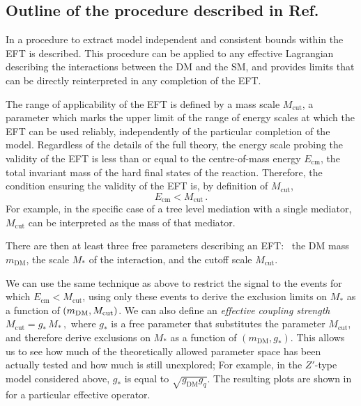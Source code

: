 \clearpage

\subsection*{Outline of the procedure described in Ref.~\cite{Racco:2015dxa}}

In \cite{Racco:2015dxa} a procedure to extract model independent and consistent bounds within the EFT is described. This procedure can be applied to any effective Lagrangian describing the interactions between the DM and the SM, and provides limits that can be directly reinterpreted in any completion of the EFT.

The range of applicability of the EFT is defined by a mass scale $M_\text{cut}$, a parameter which marks the upper limit of the range of energy scales at which the EFT can be used reliably, independently of the particular completion of the model. 
Regardless of the  details of the full theory, the energy scale probing the validity of the EFT is less than or equal to the centre-of-mass energy $E_\text{cm}$, 
the total invariant mass of the hard final states of the reaction.
Therefore, the condition ensuring the validity of the EFT is, by definition of $M_\text{cut}$,
\begin{equation}
\label{Ecm<Mcut}
E_\text{cm}<M_\text{cut}\,.
\end{equation}
For example, in the specific case of a tree level mediation with a single mediator, $M_\text{cut}$ can be interpreted as the mass of that mediator.

There are then at least three free parameters describing an EFT:~ 
the DM mass $m_\text{DM}$, the scale $M_*$ of the interaction, and the cutoff scale $M_\text{cut}$.

We can use the same technique as above to restrict the signal to the events for which $E_\text{cm}<M_\text{cut}$,  using only these events to derive the exclusion limits on $M_*$ as a function of  $(m_\text{DM},M_{\rm cut})$. 
%
We can also define an \textit{effective coupling strength} $M_\text{cut}=g_* \, M_*\,,$ where $g_*$ is a free parameter that substitutes the parameter $M_\text{cut}$, and therefore derive exclusions on $M_*$ as a function of $(m_\text{DM},g_*)$. This allows us to see how much of the theoretically allowed parameter space has been actually tested and how much is still unexplored; For example, in the $Z'$-type model considered above, $g_*$ is equal to $\sqrt{g_\text{DM}g_q}$.
%
The resulting plots are shown in \cite{Racco:2015dxa} for a particular effective operator. 

